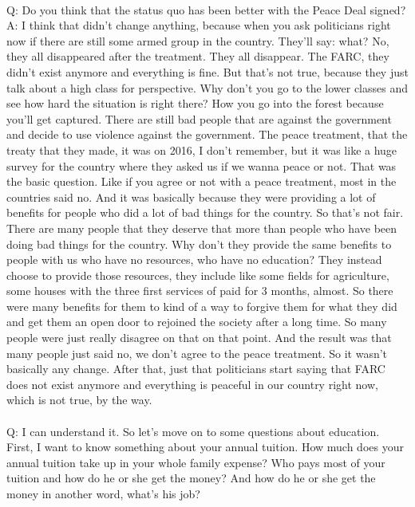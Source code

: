 \documentclass{phyasgn}\usepackage{nag}
\begin{document}
\\
Q: Do you think that the status quo has been better with the Peace Deal signed?\\
A: I think that didn't change anything, because when you ask politicians right now if there are still some armed group in the country. They'll say: what? No, they all disappeared after the treatment. They all disappear. The FARC, they didn't exist anymore and everything is fine. But that's not true, because they just talk about a high class for perspective. Why don't you go to the lower classes and see how hard the situation is right there? How you go into the forest because you'll get captured. There are still bad people that are against the government and decide to use violence against the government. The peace treatment, that the treaty that they made, it was on 2016, I don't remember, but it was like a huge survey for the country where they asked us if we wanna peace or not. That was the basic question. Like if you agree or not with a peace treatment, most in the countries said no. And it was basically because they were providing a lot of benefits for people who did a lot of bad things for the country. So that's not fair. There are many people that they deserve that more than people who have been doing bad things for the country. Why don't they provide the same benefits to people with us who have no resources, who have no education? They instead choose to provide those resources, they include like some fields for agriculture, some houses with the three first services of paid for 3 months, almost. So there were many benefits for them to kind of a way to forgive them for what they did and get them an open door to rejoined the society after a long time. So many people were just really disagree on that on that point. And the result was that many people just said no, we don't agree to the peace treatment. So it wasn't basically any change. After that, just that politicians start saying that FARC does not exist anymore and everything is peaceful in our country right now, which is not true, by the way.\\
\\
Q: I can understand it. So let's move on to some questions about education. First, I want to know something about your annual tuition. How much does your annual tuition take up in your whole family expense? Who pays most of your tuition and how do he or she get the money? And how do he or she get the money in another word, what's his job?\\
\end{document}
